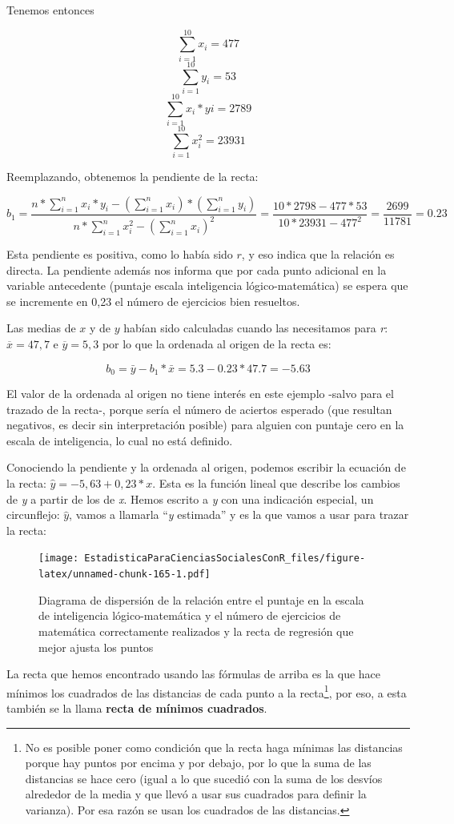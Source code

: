\documentclass[]{book}
\let\rmarkdownfootnote\footnote%
\def\footnote{\protect\rmarkdownfootnote}
\begin{document}
Tenemos entonces

\[\sum_{i=1}^{10}x_i=477\]
\[\sum_{i=1}^{10}y_i=53\]
\[\sum_{i=1}^{10}x_i*yi=2789\]
\[\sum_{i=1}^{10}x_i^{2}=23931\]

Reemplazando, obtenemos la pendiente de la recta:

\[b_1=\frac{n*\sum_{i=1}^{n}{x_i*y_i}-(\sum_{i=1}^{n}x_i)*(\sum_{i=1}^{n}y_i)}{n*\sum_{i=1}^{n}x_i^{2}-(\sum_{i=1}^{n}x_i )^{2}}= \frac{10*2798-477*53}{10*23931-477^{2}}=\frac{2699}{11781}=0.23\]

Esta pendiente es positiva, como lo había sido \(r\), y eso indica que la relación es directa. La pendiente además nos informa que por cada punto adicional en la variable antecedente (puntaje escala inteligencia lógico-matemática) se espera que se incremente en 0,23 el número de ejercicios bien resueltos.

Las medias de \(x\) y de \(y\) habían sido calculadas cuando las necesitamos
para \emph{r}: \(\overline{x} = 47,7\) e \(\overline{y} = 5,3\) por lo que la
ordenada al origen de la recta es:

\[b_0=\bar{y}-b_1*\bar{x}=5.3-0.23*47.7=-5.63\]

El valor de la ordenada al origen no tiene interés en este ejemplo
-salvo para el trazado de la recta-, porque sería el número de aciertos esperado (que resultan negativos, es decir sin interpretación posible) para alguien con puntaje cero en la escala de inteligencia, lo cual no está definido.

Conociendo la pendiente y la ordenada al origen, podemos escribir la
ecuación de la recta: \(\widehat{y} = - 5,63 + 0,23*x\). Esta es la
función lineal que describe los cambios de \emph{y} a partir de los de \emph{x}.
Hemos escrito a \emph{y} con una indicación especial, un
circunflejo: \(\widehat{y}\), vamos a llamarla ``\emph{y} estimada'' y es la que
vamos a usar para trazar la recta:

\begin{figure}
\centering
\texttt{[image: EstadisticaParaCienciasSocialesConR\_files/figure-latex/unnamed-chunk-165-1.pdf]}
\caption{\label{fig:unnamed-chunk-165}Diagrama de dispersión de la relación entre el puntaje en la escala de inteligencia lógico-matemática y el número de ejercicios de matemática correctamente realizados y la recta de regresión que mejor ajusta los puntos}
\end{figure}

La recta que hemos encontrado usando las fórmulas de arriba es la que
hace mínimos los cuadrados de las distancias de cada punto a la
recta\footnote{No es posible poner como condición que la recta haga mínimas las distancias porque hay puntos por encima y por debajo, por lo que la suma de las distancias se hace cero (igual a lo que sucedió con la suma de los desvíos alrededor de la media y que llevó a usar sus cuadrados para definir la varianza). Por esa razón se usan los cuadrados de las distancias.}, por eso, a esta también se la llama \textbf{recta de mínimos cuadrados}.
\end{document}
